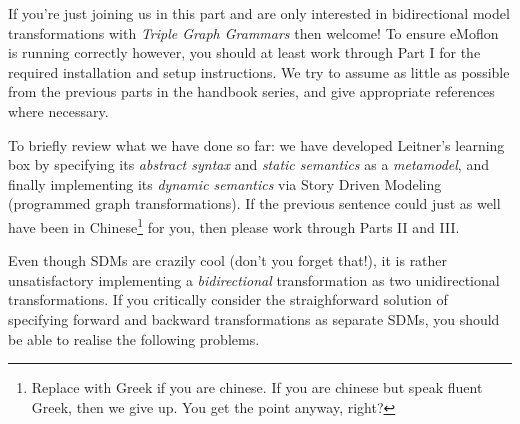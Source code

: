 \genHeader
\label{chap:Learning-Box-to-Dictionary-and-Back-Again}


\downloadLocation{\dlPartFour}

If you're just joining us in this part and are only interested in bidirectional model transformations with \emph{Triple Graph Grammars} then welcome! To ensure
eMoflon is running correctly however, you should at least work through Part I for the required installation and setup instructions. We try to assume as little
as possible from the previous parts in the handbook series, and give appropriate references where necessary.

To briefly review what we have done so far: we have developed Leitner's learning box by specifying its \emph{abstract syntax} and \emph{static semantics} as a
\emph{metamodel}, and finally implementing its \emph{dynamic semantics} via Story Driven Modeling (programmed graph transformations). If the previous sentence
could just as well have been in Chinese\footnote{Replace with Greek if you are chinese.  If you are chinese but speak fluent Greek, then we give up. You get the
point anyway, right?} for you, then please work through Parts II and III.

Even though SDMs are crazily cool (don't you forget that!), it is rather unsatisfactory implementing a \emph{bidirectional} transformation as two unidirectional
transformations. If you critically consider the straighforward solution of specifying forward and backward transformations as separate SDMs, you should be able
to realise the following problems.

\vspace{-0.5cm}

